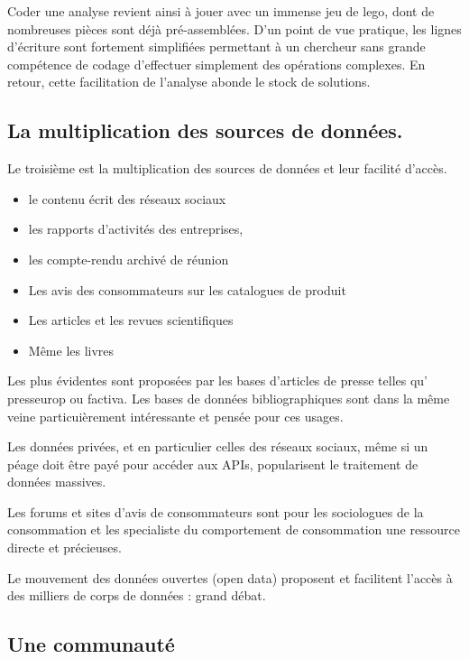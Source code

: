 \documentclass[
]{book}
\providecommand{\tightlist}{%
  \setlength{\itemsep}{0pt}\setlength{\parskip}{0pt}}
\begin{document}
Coder une analyse revient ainsi à jouer avec un immense jeu de lego, dont de nombreuses pièces sont déjà pré-assemblées. D'un point de vue pratique, les lignes d'écriture sont fortement simplifiées permettant à un chercheur sans grande compétence de codage d'effectuer simplement des opérations complexes. En retour, cette facilitation de l'analyse abonde le stock de solutions.

\hypertarget{la-multiplication-des-sources-de-donnuxe9es.}{%
\subsection{La multiplication des sources de données.}\label{la-multiplication-des-sources-de-donnuxe9es.}}

Le troisième est la multiplication des sources de données et leur facilité d'accès.

\begin{itemize}
\tightlist
\item
  le contenu écrit des réseaux sociaux
\item
  les rapports d'activités des entreprises,
\item
  les compte-rendu archivé de réunion
\item
  Les avis des consommateurs sur les catalogues de produit
\item
  Les articles et les revues scientifiques
\item
  Même les livres
\end{itemize}

Les plus évidentes sont proposées par les bases d'articles de presse telles qu' presseurop ou factiva. Les bases de données bibliographiques sont dans la même veine particuièrement intéressante et pensée pour ces usages.

Les données privées, et en particulier celles des réseaux sociaux, même si un péage doit être payé pour accéder aux APIs, popularisent le traitement de données massives.

Les forums et sites d'avis de consommateurs sont pour les sociologues de la consommation et les specialiste du comportement de consommation une ressource directe et précieuses.

Le mouvement des données ouvertes (open data) proposent et facilitent l'accès à des milliers de corps de données : grand débat.

\hypertarget{une-communautuxe9}{%
\subsection{Une communauté}\label{une-communautuxe9}}
\end{document}

